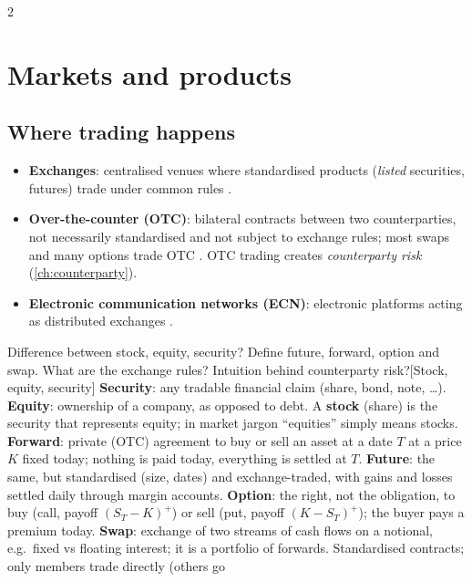 \begin{paracol}{2}
\section{Markets and products}\label{sec:products}

\clearpage\subsection{Where trading happens}
\begin{itemize}
  \item \textbf{Exchanges}: centralised venues where standardised products (\emph{listed}
        securities, futures) trade under common rules .
  \item \textbf{Over-the-counter (OTC)}: bilateral contracts between two counterparties,
        not necessarily standardised and not subject to exchange rules; most swaps and many
        options trade OTC . OTC trading creates \emph{counterparty risk}
        (\cref{ch:counterparty}).
  \item \textbf{Electronic communication networks (ECN)}: electronic platforms acting as
        distributed exchanges .
\end{itemize}
\begin{answer}{Difference between stock, equity, security? Define future, forward, option and swap. What are the exchange rules? Intuition behind counterparty risk?}[Stock, equity, security]
\textbf{Security}: any tradable financial claim (share, bond, note, \dots).
        \textbf{Equity}: ownership of a company, as opposed to debt. A \textbf{stock} (share) is the
        security that represents equity; in market jargon ``equities'' simply means stocks.
\label{ans:derivatives}
\textbf{Forward}: private (OTC) agreement to buy or sell an asset at a date $T$ at a price
        $K$ fixed today; nothing is paid today, everything is settled at $T$.
        \textbf{Future}: the same, but standardised (size, dates) and exchange-traded, with gains and
        losses settled daily through margin accounts. \textbf{Option}: the right, not the
        obligation, to buy (call, payoff $(S_T-K)^+$) or sell (put, payoff $(K-S_T)^+$); the buyer
        pays a premium today. \textbf{Swap}: exchange of two streams of cash flows on a notional,
        e.g.\ fixed vs floating interest; it is a portfolio of forwards.
Standardised contracts; only members trade directly (others go

\end{answer}
\end{paracol}
